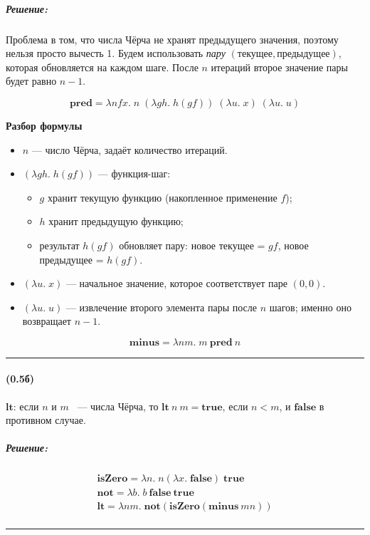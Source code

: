 \documentclass{article}
\newenvironment{proof}{\subparagraph{\hspace{-1em}Решение:\newline}}{\par\noindent\rule{\textwidth}{0.4pt}}
\newcommand{\term}[1]{\mathbf{#1}}
\renewcommand{\emph}[1]{{\color{blue} \textit{#1}}}
\begin{document}
    \begin{proof}
        Проблема в том, что числа Чёрча не хранят предыдущего значения, поэтому нельзя просто вычесть 1.
        Будем использовать \emph{пару} $(\text{текущее}, \text{предыдущее})$, которая обновляется на каждом шаге.
        После $n$ итераций второе значение пары будет равно $n-1$.

        \[
            \term{pred} = \lambda n f x.\; n\; (\lambda g h.\; h (g f))\; (\lambda u.\; x)\; (\lambda u.\; u)
        \]

        \textbf{Разбор формулы}
        \begin{itemize}
            \item $n$ --- число Чёрча, задаёт количество итераций.
            \item $(\lambda g h.\; h (g f))$ --- функция-шаг:
            \begin{itemize}
                \item $g$ хранит текущую функцию (накопленное применение $f$);
                \item $h$ хранит предыдущую функцию;
                \item результат $h(g f)$ обновляет пару: новое текущее = $g f$, новое предыдущее = $h(g f)$.
            \end{itemize}
            \item $(\lambda u.\; x)$ --- начальное значение, которое соответствует паре $(0,0)$.
            \item $(\lambda u.\; u)$ --- извлечение второго элемента пары после $n$ шагов; именно оно возвращает $n-1$.
        \end{itemize}

        \[
            \term{minus} = \lambda n m.\; m~\term{pred}~n
        \]
    \end{proof}

    \paragraph{(0.5б)}

    $\term{lt}$: если $n$ и $m$ ~--- числа Чёрча, то $\term{lt}~n~m = \term{true}$, если $n < m$, и $\term{false}$ в противном случае.

    \begin{proof}
        \begin{gather*}
            \term{isZero} = \lambda n.\; n (\lambda x.\; \term{false})\; \term{true}\\
            \term{not} = \lambda b.\; b\ \term{false}\ \term{true}\\
            \term{lt} = \lambda n m.\; \term{not}(\term{isZero}(\term{minus}~mn))\\
        \end{gather*}
    \end{proof}
\end{document}
